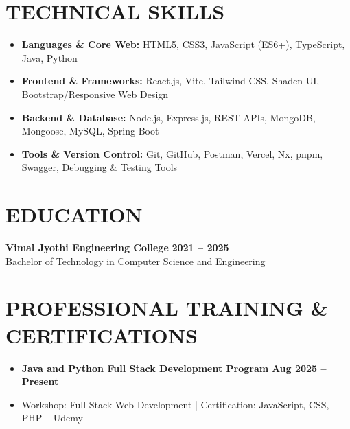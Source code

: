 \documentclass[a4paper,10pt]{article}
\begin{document}
\section*{TECHNICAL SKILLS}
\begin{itemize}
    \item \textbf{Languages \& Core Web:} HTML5, CSS3, JavaScript (ES6+), TypeScript, Java, Python
    \item \textbf{Frontend \& Frameworks:} React.js, Vite, Tailwind CSS, Shadcn UI, Bootstrap/Responsive Web Design
    \item \textbf{Backend \& Database:} Node.js, Express.js, REST APIs, MongoDB, Mongoose, MySQL, Spring Boot
    \item \textbf{Tools \& Version Control:} Git, GitHub, Postman, Vercel, Nx, pnpm, Swagger, Debugging \& Testing Tools
\end{itemize}

\section*{EDUCATION}
\textbf{Vimal Jyothi Engineering College} \hfill \textbf{2021 -- 2025}\\
Bachelor of Technology in Computer Science and Engineering\\

\section*{PROFESSIONAL TRAINING \& CERTIFICATIONS}
\begin{itemize}
    \item \textbf{Java and Python Full Stack Development Program} \hfill \textbf{Aug 2025 -- Present}
    \item Workshop: Full Stack Web Development \;|\; Certification: JavaScript, CSS, PHP -- Udemy
\end{itemize}
\end{document}
